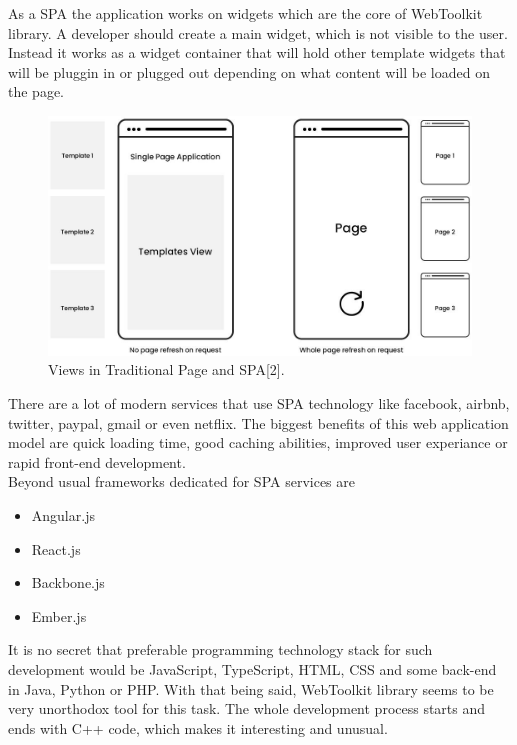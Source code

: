 \documentclass[a4paper,12pt]{article}
\begin{document}
{{\bigskip
As a SPA the application works on widgets which are the core of WebToolkit library. A developer should create a main widget, which is not visible to the user. Instead it works as a widget container that will hold other template widgets that will be pluggin in or plugged out depending on what content will be loaded on the page.  

\begin{figure}[h]
  \centering
    \includegraphics[width=1.0\textwidth]{spa-template}
    \caption{Views in Traditional Page and SPA[2].}
\end{figure} 

\bigskip
There are a lot of modern services that use SPA technology like facebook, airbnb, twitter, paypal, gmail or even netflix. The biggest benefits of this web application model are quick loading time, good caching abilities, improved user experiance or rapid front-end development. \\

\bigskip
Beyond usual frameworks dedicated for SPA services are
\begin{itemize}
	\item  Angular.js
	\item React.js
	\item Backbone.js
	\item Ember.js
\end{itemize}

It is no secret that preferable programming technology stack for such development would be JavaScript, TypeScript, HTML, CSS and some back-end in Java, Python or PHP. With that being said, WebToolkit library seems to be very unorthodox tool for this task. The whole development process starts and ends with C++ code, which makes it interesting and unusual.
\newpage

}}
\end{document}
